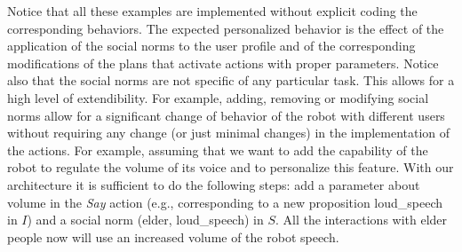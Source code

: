 Notice that all these examples are implemented without explicit coding the corresponding behaviors. The expected personalized behavior is the effect of the application of the social norms to the user profile and of the corresponding modifications of the plans that activate actions with proper parameters. Notice also that the social norms are not specific of any particular task. This allows for a high level of extendibility. For example, adding, removing or modifying social norms allow for a significant change of behavior of the robot with different users without requiring any change (or just minimal changes) in the implementation of the actions. For example, assuming that we want to add the capability of the robot to regulate the volume of its voice and to personalize this feature. With our architecture it is sufficient to do the following steps: add a parameter about volume in the \emph{Say} action (e.g., corresponding to a new proposition loud\_speech in $I$) and a social norm 
(elder, loud\_speech)  in $S$. All the interactions with elder people now will use an increased volume of the robot speech.

